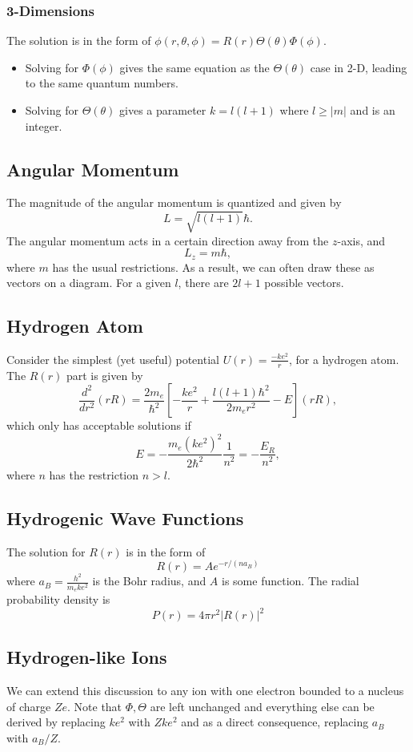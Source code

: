 \documentclass{article}
\begin{document}
\subsubsection*{3-Dimensions}
The solution is in the form of $\phi(r,\theta,\phi)=R(r)\Theta(\theta)\Phi(\phi).$ 
\begin{itemize}
    \item Solving for $\Phi(\phi)$ gives the same equation as the $\Theta(\theta)$ case in 2-D, leading to the same quantum numbers. 
    \item Solving for $\Theta(\theta)$ gives a parameter $k=l(l+1)$ where $l \ge |m|$ and is an integer.
\end{itemize} 
\subsection{Angular Momentum}
The magnitude of the angular momentum is quantized and given by
\begin{equation}
    L = \sqrt{l(l+1)}\hbar.
\end{equation} 
The angular momentum acts in a certain direction away from the $z$-axis, and
\begin{equation}
    L_z = m\hbar,
\end{equation}
where $m$ has the usual restrictions. As a result, we can often draw these as vectors on a diagram. For a given $l$, there are $2l+1$ possible vectors.
\subsection{Hydrogen Atom}
Consider the simplest (yet useful) potential $U(r) = \frac{-ke^2}{r}$, for a hydrogen atom. The $R(r)$ part is given by
\begin{equation}
    \frac{d^2}{dr^2}(rR)  = \frac{2m_e}{\hbar^2}\left[-\frac{ke^2}{r}+\frac{l(l+1)\hbar^2}{2m_er^2}-E\right](rR),
\end{equation}
which only has acceptable solutions if
\begin{equation}
    E = -\frac{m_e(ke^2)^2}{2\hbar^2}\frac{1}{n^2} =  - \frac{E_R}{n^2},
\end{equation}
where $n$ has the restriction $n>l.$
\subsection{Hydrogenic Wave Functions}
The solution for $R(r)$ is in the form of
\begin{equation}
    R(r) = Ae^{-r/(na_B)}
\end{equation}
where $a_B = \frac{h^2}{m_eke^2}$ is the Bohr radius, and $A$ is some function. The radial probability density is
\begin{equation}
    P(r) = 4\pi r^2 |R(r)|^2
\end{equation}
\subsection{Hydrogen-like Ions}
We can extend this discussion to any ion with one electron bounded to a nucleus of charge $Ze$. Note that $\Phi,\Theta$ are left unchanged and everything else can be derived by replacing $ke^2$ with $Zke^2$ and as a direct consequence, replacing $a_B$ with $a_B/Z.$
\end{document}
